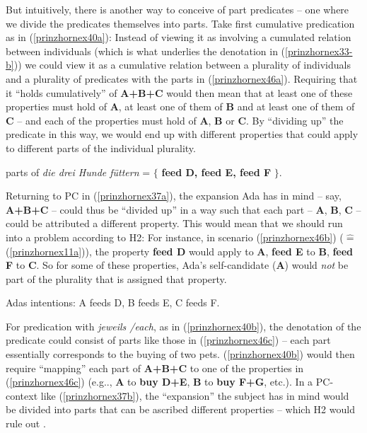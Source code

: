\documentclass[output=paper,colorlinks,citecolor=brown,
]{langscibook}
\begin{document}
\ea  \label{prinzhornpc}
	\z\z

But intuitively, there is another way  to conceive of part predicates -- one where we divide the predicates themselves into parts. Take first cumulative predication as in (\ref{prinzhornex40a}): Instead of viewing it as involving a cumulated relation between individuals (which is what underlies the denotation in (\ref{prinzhornex33-b})) we could view it as a cumulative relation between a plurality of individuals and a plurality of predicates with the parts in  (\ref{prinzhornex46a}). Requiring that it “holds cumulatively” of \textbf{A+B+C} would then mean that at least one of these properties must hold of \textbf{A}, at least one of them  of \textbf{B} and at least one of them of \textbf{C} -- and each of the properties must hold of \textbf{A}, \textbf{B} or \textbf{C}. By “dividing up” the predicate in this way, we would  end up with different properties that could apply to different parts of the individual plurality.

\ea  parts of \textit{die drei Hunde füttern} = $\{$ \textbf{feed D, feed E, feed F} $\}$.\label{prinzhornex46a}
\z

Returning to PC in (\ref{prinzhornex37a}), the expansion Ada has in mind -- say, {\bf A+B+C} -- could thus be “divided up” in a way such that each part -- {\bf A}, {\bf B}, {\bf C} -- could be attributed a different property. This would mean that we should run into a problem according to H2: For instance, in scenario (\ref{prinzhornex46b}) ($\widehat{=}$ (\ref{prinzhornex11a})), the property {\bf feed D} would apply to \textbf{A},  {\bf feed E} to \textbf{B}, \textbf{feed F} to \textbf{C}. So for some of these properties, Ada's self-candidate (\textbf{A}) would \textit{not}  be part of the plurality that is assigned that property.

 Adas intentions: A feeds D, B feeds E, C feeds F. \label{prinzhornex46b} \z

For predication with \textit{jeweils /each}, as in (\ref{prinzhornex40b}), the denotation of  the predicate could consist of parts like those in (\ref{prinzhornex46c}) -- each part essentially corresponds to the buying of two pets. (\ref{prinzhornex40b}) would then require “mapping” each part of \textbf{A+B+C} to one of the properties in (\ref{prinzhornex46c}) (e.g.., \textbf{A} to \textbf{buy D+E}, \textbf{B} to \textbf{buy F+G}, etc.). In a PC-context like (\ref{prinzhornex37b}),  the “expansion” the subject has in mind would be divided into parts that can be ascribed different properties -- which H2 would rule out .
\end{document}
